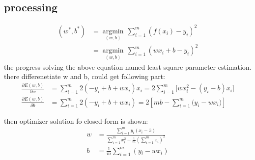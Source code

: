 \documentclass[12pt]{ctexart}%
\begin{document}
	\subsection{\quad processing}
	\begin{align}
	({{w}^{*}},{{b}^{*}}) & =\underset{(w,b)}{\mathop{\arg \min }}\,\sum\limits_{i=1}^{m}{{{(f({{x}_{i}})-{{y}_{i}})}^{2}}} \\ 
	& =\underset{(w,b)}{\mathop{\arg \min }}\,\sum\limits_{i=1}^{m}{{{(w{{x}_{i}}+b-{{y}_{i}})}^{2}}} 
	\end{align}
	the progress solving the above equation named least square parameter estimation. there differenetiate w and b, could get following part:
	\begin{align}
	\frac{\partial E(w,b)}{\partial w}&=\sum\limits_{i=1}^{m}{2(-{{y}_{i}}+b+w{{x}_{i}}){{x}_{i}}}=2\sum\limits_{i=1}^{m}{[wx_{i}^{2}-({{y}_{i}}-b)}{{x}_{i}}]\\
	\frac{\partial E(w,b)}{\partial b}&=\sum\limits_{i=1}^{m}{2(-{{y}_{i}}+b+w{{x}_{i}})}=2[mb-\sum\limits_{i=1}^{m}{({{y}_{i}}-w{{x}_{i}}})]
	\end{align}

	then optimizer solution fo closed-form is shown:
	\begin{align}
	w&=\frac{\sum\limits_{i=1}^{m}{{{y}_{i}}({{x}_{i}}-\bar{x})}}{\sum\limits_{i=1}^{m}{x_{i}^{2}-\frac{1}{m}{{(\sum\limits_{i=1}^{m}{{{x}_{i}}})}^{2}}}}\\
	b&=\frac{1}{m}\sum\limits_{i=1}^{m}{(y{}_{i}-w{{x}_{i}})}
	\end{align}
\end{document}
